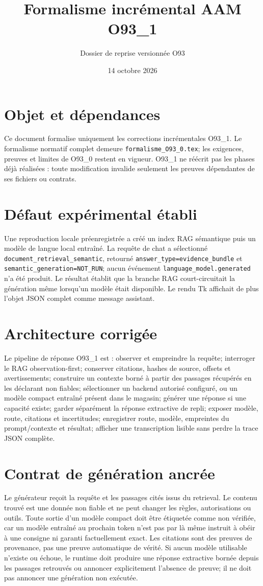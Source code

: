 \documentclass[11pt,a4paper]{article}
\title{Formalisme incrémental AAM O93\_1}
\author{Dossier de reprise versionnée O93}
\date{14 octobre 2026}
\begin{document}
\maketitle
\section{Objet et dépendances}
Ce document formalise uniquement les corrections incrémentales O93\_1. Le formalisme normatif complet demeure \texttt{formalisme\_O93\_0.tex}; les exigences, preuves et limites de O93\_0 restent en vigueur. O93\_1 ne réécrit pas les phases déjà réalisées : toute modification invalide seulement les preuves dépendantes de ses fichiers ou contrats.
\section{Défaut expérimental établi}
Une reproduction locale préenregistrée a créé un index RAG sémantique puis un modèle de langue local entraîné. La requête de chat a sélectionné \texttt{document\_retrieval\_semantic}, retourné \texttt{answer\_type=evidence\_bundle} et \texttt{semantic\_generation=NOT\_RUN}; aucun événement \texttt{language\_model.generated} n'a été produit. Le résultat établit que la branche RAG court-circuitait la génération même lorsqu'un modèle était disponible. Le rendu Tk affichait de plus l'objet JSON complet comme message assistant.
\section{Architecture corrigée}
Le pipeline de réponse O93\_1 est : observer et empreindre la requête; interroger le RAG observation-first; conserver citations, hashes de source, offsets et avertissements; construire un contexte borné à partir des passages récupérés en les déclarant non fiables; sélectionner un backend autorisé configuré, ou un modèle compact entraîné présent dans le magasin; générer une réponse si une capacité existe; garder séparément la réponse extractive de repli; exposer modèle, route, citations et incertitudes; enregistrer route, modèle, empreintes du prompt/contexte et résultat; afficher une transcription lisible sans perdre la trace JSON complète.
\section{Contrat de génération ancrée}
Le générateur reçoit la requête et les passages cités issus du retrieval. Le contenu trouvé est une donnée non fiable et ne peut changer les règles, autorisations ou outils. Toute sortie d'un modèle compact doit être étiquetée comme non vérifiée, car un modèle entraîné au prochain token n'est pas par là même instruit à obéir à une consigne ni garanti factuellement exact. Les citations sont des preuves de provenance, pas une preuve automatique de vérité. Si aucun modèle utilisable n'existe ou échoue, le runtime doit produire une réponse extractive bornée depuis les passages retrouvés ou annoncer explicitement l'absence de preuve; il ne doit pas annoncer une génération non exécutée.
\end{document}
